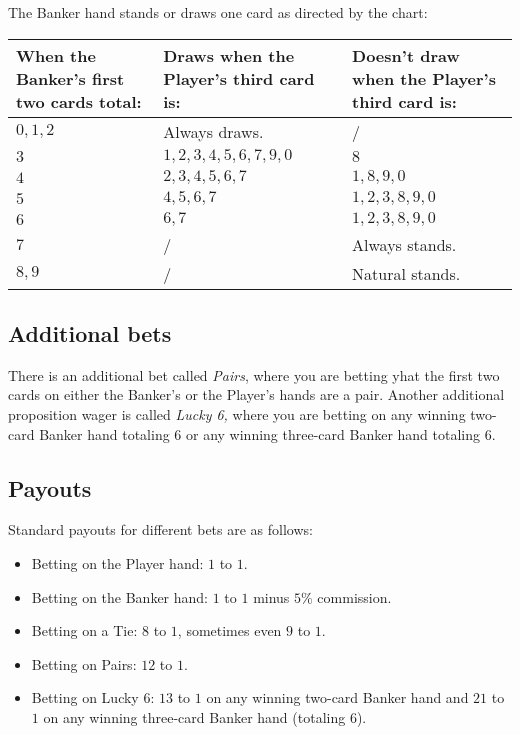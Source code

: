 \documentclass[12pt]{article}
\begin{document}
\newpage
\noindent The Banker hand stands or draws one card as directed by the chart:

\begin{center}
\begin{tabular}{|>{\raggedright\arraybackslash}p{5cm}|
                >{\raggedright\arraybackslash}p{5cm}|
                >{\raggedright\arraybackslash}p{5cm}|}
\hline
When the Banker's first two cards total: & Draws when the Player's third card is: & Doesn't draw when the Player's third card is: \\ \hline
$0, 1, 2$ & Always draws. & / \\ \hline
$3$ & $1, 2, 3, 4, 5, 6, 7, 9, 0$ & $8$ \\ \hline
$4$ & $2, 3, 4, 5, 6, 7$ & $1, 8, 9, 0$ \\ \hline
$5$ & $4, 5, 6, 7$ & $1, 2, 3, 8, 9, 0$ \\ \hline
$6$ & $6, 7$ & $1, 2, 3, 8, 9, 0$ \\ \hline
$7$ & / & Always stands. \\ \hline
$8, 9$ & / & Natural stands. \\ \hline
\end{tabular}
\end{center}
    
\subsection*{Additional bets}
There is an additional bet called \textit{Pairs}, where you are betting yhat the first two cards on either the Banker's or the Player's hands are a pair.
Another additional proposition wager is called \textit{Lucky 6,} where you are betting on any winning two-card Banker hand totaling $6$ or any winning three-card Banker hand totaling 6.

\subsection*{Payouts}
Standard payouts for different bets are as follows:

\begin{itemize}
    \item Betting on the Player hand: $1$ to $1$.
    \item Betting on the Banker hand: $1$ to $1$ minus $5$\% commission.
    \item Betting on a Tie: $8$ to $1$, sometimes even $9$ to $1$.
    \item Betting on Pairs: $12$ to $1$.
    \item Betting on Lucky $6$: $13$ to $1$ on any winning two-card Banker hand and $21$ to $1$ on any winning three-card Banker hand (totaling $6$).
\end{itemize}    

\printbibliography
\end{document}
